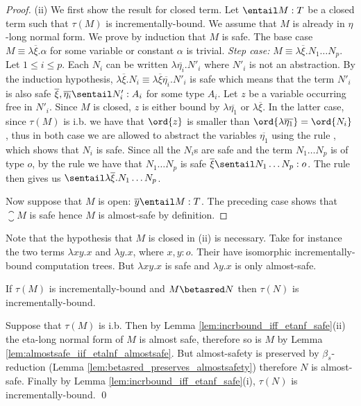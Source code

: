 \begin{proof}
(ii) We first show the result for closed term. Let $\entail M :T$ be a closed term such that $\tau(M)$ is incrementally-bound. We assume that $M$ is already in $\eta$-long normal form. We prove by induction that $M$ is safe. The
base case $M \equiv \lambda \overline{\xi} . \alpha$ for some variable or
constant $\alpha$ is trivial. \emph{Step case:} $M \equiv \lambda
\overline{\xi} . N_1 \ldots N_p$. Let $1\leq i\leq p$. Each $N_i$
can be written $\lambda \overline{\eta_i} . N'_i$ where $N'_i$ is
not an abstraction. By the induction hypothesis, $\lambda
\overline{\xi} . N_i \equiv \lambda\overline\xi\overline{\eta_i} .
N'_i$ is safe which means that the term $N'_i$ is also safe \ie
$\overline\xi, \overline{\eta_i} \sentail N'_i :A_i$ for some type $A_i$.
Let $z$ be a variable occurring free in $N'_i$. Since $M$ is
closed, $z$ is either bound by $\lambda \overline{\eta_1}$ or
$\lambda \overline{\xi}$. In the latter case, since $\tau(M)$ is
i.b. we have that $\ord{z}$ is smaller than $\ord{\lambda
\overline{\eta_1}}=\ord{N_i}$, thus in both case we are allowed to
abstract the variables $\overline{\eta_1}$ using the rule
, which shows that $N_i$ is safe.
Since all the $N_i$s are safe and the term $N_1 \ldots N_p$ is of type $o$, by the rule  we have that $N_1 \ldots N_p$ is safe \ie $\overline{\xi} \sentail N_1 \ldots N_p :o$. The rule  then gives us $\sentail \lambda \overline{\xi} . N_1 \ldots N_p$.

Now suppose that $M$ is open: $\overline{y} \entail M:T$. The preceding case shows that $\closure{M}$ is safe hence $M$ is almost-safe by definition.
\end{proof}

Note that the hypothesis that $M$ is closed in (ii) is necessary.
Take for instance the two terms $\lambda x y .x$ and $\lambda y . x$,
where $x,y:o$. Their have isomorphic incrementally-bound computation
trees. But $\lambda x y .x$ is safe and $\lambda y . x$ is
only almost-safe.


\begin{corollary}
\label{cor:betasred_preserve_incrbound} If $\tau(M)$ is incrementally-bound and $M \betasred N$ then $\tau(N)$ is incrementally-bound.
\end{corollary}
\proof Suppose that $\tau(M)$ is i.b. Then by Lemma
\ref{lem:incrbound_iff_etanf_safe}(ii) the eta-long normal form of $M$ is almost safe, therefore so is $M$ by Lemma \ref{lem:almostsafe_iif_etalnf_almostsafe}.
But almost-safety is preserved by $\beta_s$-reduction (Lemma \ref{lem:betasred_preserves_almostsafety}) therefore $N$ is almost-safe. Finally by Lemma \ref{lem:incrbound_iff_etanf_safe}(i), $\tau(N)$ is
incrementally-bound. \qed 
\smallskip

